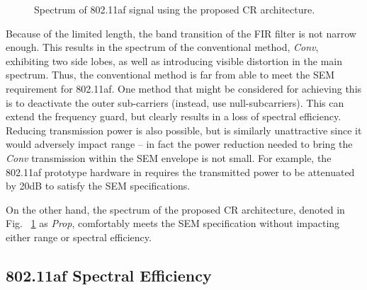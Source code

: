 \begin{figure}
	\centering
	\vspace{-2mm}
\caption{Spectrum of 802.11af signal using the proposed CR architecture.}
\label{fig:80211af}
\end{figure}
%
Because of the limited length, the band transition of the FIR filter is not narrow enough.
This results in the spectrum of the conventional method, \emph{Conv}, exhibiting two side lobes, as well as introducing visible distortion in the main spectrum.
Thus, the conventional method is far from able to meet the SEM requirement for 802.11af.
One method that might be considered for achieving this is to deactivate the outer sub-carriers (instead, use null-subcarriers).
This can extend the frequency guard, but clearly results in a loss of spectral efficiency.
Reducing transmission power is also possible, but is similarly unattractive since it would adversely impact range -- in fact the power reduction needed to bring the \emph{Conv} transmission within the SEM envelope is not small.
For example, the 802.11af prototype hardware in \cite{Lan2013} requires the transmitted power to be attenuated by 20dB to satisfy the SEM specifications.

On the other hand, the spectrum of the proposed CR architecture, denoted in Fig. ~\ref{fig:80211af} as \emph{Prop}, comfortably meets the SEM specification without impacting either range or spectral efficiency.

\subsection{802.11af Spectral Efficiency}

